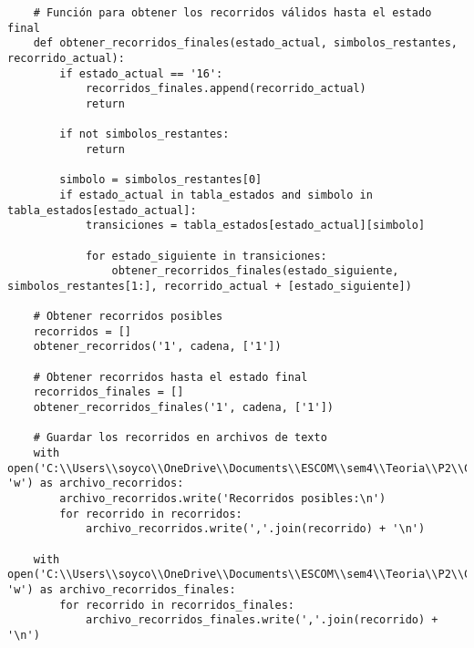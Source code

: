 \begin{enumerate}
\begin{lstlisting}
    # Función para obtener los recorridos válidos hasta el estado final
    def obtener_recorridos_finales(estado_actual, simbolos_restantes, recorrido_actual):
        if estado_actual == '16':
            recorridos_finales.append(recorrido_actual)
            return

        if not simbolos_restantes:
            return

        simbolo = simbolos_restantes[0]
        if estado_actual in tabla_estados and simbolo in tabla_estados[estado_actual]:
            transiciones = tabla_estados[estado_actual][simbolo]

            for estado_siguiente in transiciones:
                obtener_recorridos_finales(estado_siguiente, simbolos_restantes[1:], recorrido_actual + [estado_siguiente])

    # Obtener recorridos posibles
    recorridos = []
    obtener_recorridos('1', cadena, ['1'])

    # Obtener recorridos hasta el estado final
    recorridos_finales = []
    obtener_recorridos_finales('1', cadena, ['1'])

    # Guardar los recorridos en archivos de texto
    with open('C:\\Users\\soyco\\OneDrive\\Documents\\ESCOM\\sem4\\Teoria\\P2\\Chess\\output\\recorridos.txt', 'w') as archivo_recorridos:
        archivo_recorridos.write('Recorridos posibles:\n')
        for recorrido in recorridos:
            archivo_recorridos.write(','.join(recorrido) + '\n')

    with open('C:\\Users\\soyco\\OneDrive\\Documents\\ESCOM\\sem4\\Teoria\\P2\\Chess\\output\\recorridos_finales.txt', 'w') as archivo_recorridos_finales:
        for recorrido in recorridos_finales:
            archivo_recorridos_finales.write(','.join(recorrido) + '\n')




\end{lstlisting}
\end{enumerate}
